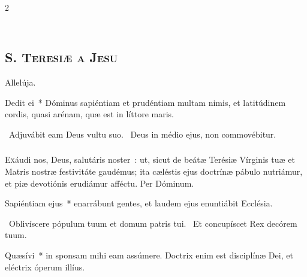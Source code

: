 \documentclass[9pt,twoside]{extarticle}
\begin{document}
\begin{multicols}{2}
\subsection*{\\ \textbf{\textsc{S. Teresiæ a Jesu}}}

\smallskip
\small {}

 Allelúja.

\normalsize
{} Dedit ei~* Dóminus sapiéntiam et prudéntiam multam nimis, et latitúdinem cordis, quasi arénam, quæ est in líttore maris.

~Adjuvábit eam Deus vultu suo. ~Deus in médio ejus, non commovébitur.

\subsubsection*{\center {}}
\lettrine{E}{x}áudi nos, Deus, salutáris noster~: ut, sicut de beátæ Terésiæ Vírginis tuæ et Matris nostræ festivitáte gaudémus; ita cæléstis ejus doctrínæ pábulo nutriámur, et piæ devotiónis erudiámur afféctu. Per Dóminum.

 Sapiéntiam ejus~* enarrábunt gentes, et laudem ejus enuntiábit Ecclésia.

~Oblivíscere pópulum tuum et domum patris tui. ~Et concupíscet Rex decórem tuum.

\smallskip
{} Quæsívi~* in sponsam mihi eam assúmere. Doctrix enim est disciplínæ Dei, et eléctrix óperum illíus.


\end{multicols}
\end{document}
